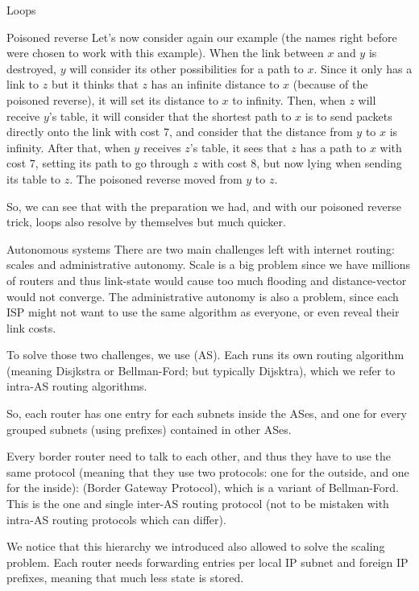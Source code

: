 \documentclass[a4paper]{article}
\begin{document}
\begin{parag}{Loops}
\begin{subparag}{Poisoned reverse}
        Let's now consider again our example (the names right before were chosen to work with this example). When the link between $x$ and $y$ is destroyed, $y$ will consider its other possibilities for a path to $x$. Since it only has a link to $z$ but it thinks that $z$ has an infinite distance to $x$ (because of the poisoned reverse), it will set its distance to $x$ to infinity. Then, when $z$ will receive $y$'s table, it will consider that the shortest path to $x$ is to send packets directly onto the link with cost 7, and consider that the distance from $y$ to $x$ is infinity. After that, when $y$ receives $z$'s table, it sees that $z$ has a path to $x$ with cost $7$, setting its path to go through $z$ with cost $8$, but now lying when sending its table to $z$. The poisoned reverse moved from $y$ to $z$.

        So, we can see that with the preparation we had, and with our poisoned reverse trick, loops also resolve by themselves but much quicker.
    \end{subparag}
\end{parag}

\begin{parag}{Autonomous systems}
    There are two main challenges left with internet routing: scales and administrative autonomy. Scale is a big problem since we have millions of routers and thus link-state would cause too much flooding and distance-vector would not converge. The administrative autonomy is also a problem, since each ISP might not want to use the same algorithm as everyone, or even reveal their link costs.

    To solve those two challenges, we use  (AS). Each runs its own routing algorithm (meaning Disjkstra or Bellman-Ford; but typically Dijsktra), which we refer to intra-AS routing algorithms.


    So, each router has one entry for each subnets inside the ASes, and one for every grouped subnets (using prefixes) contained in other ASes.

    Every border router need to talk to each other, and thus they have to use the same protocol (meaning that they use two protocols: one for the outside, and one for the inside):  (Border Gateway Protocol), which is a variant of Bellman-Ford. This is the one and single inter-AS routing protocol (not to be mistaken with intra-AS routing protocols which can differ).

    We notice that this hierarchy we introduced also allowed to solve the scaling problem. Each router needs forwarding entries per local IP subnet and foreign IP prefixes, meaning that much less state is stored. 
\end{parag}
\end{document}
